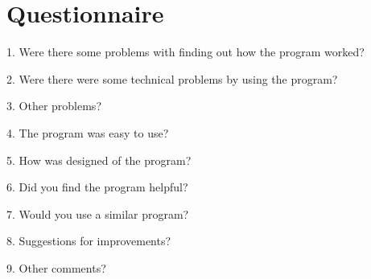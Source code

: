 \section{Questionnaire}

1. Were there some problems with finding out how the program worked?

2. Were there were some technical problems by using the program?

3. Other problems?

4. The program was easy to use?

5. How was designed of the program?

6. Did you find the program helpful?

7. Would you use a similar program?

8. Suggestions for improvements?

9. Other comments?